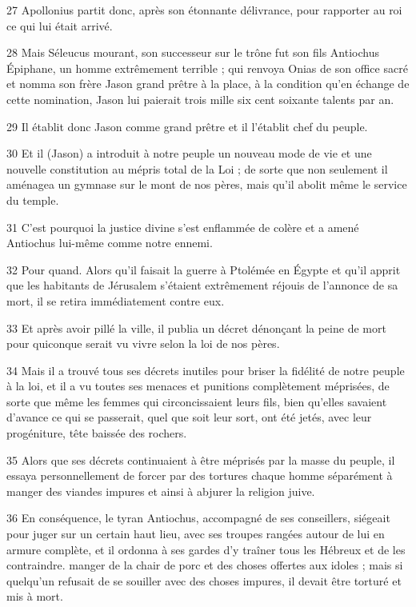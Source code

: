 \par 27 Apollonius partit donc, après son étonnante délivrance, pour rapporter au roi ce qui lui était arrivé.

\par 28 Mais Séleucus mourant, son successeur sur le trône fut son fils Antiochus Épiphane, un homme extrêmement terrible ; qui renvoya Onias de son office sacré et nomma son frère Jason grand prêtre à la place, à la condition qu'en échange de cette nomination, Jason lui paierait trois mille six cent soixante talents par an.

\par 29 Il établit donc Jason comme grand prêtre et il l'établit chef du peuple.

\par 30 Et il (Jason) a introduit à notre peuple un nouveau mode de vie et une nouvelle constitution au mépris total de la Loi ; de sorte que non seulement il aménagea un gymnase sur le mont de nos pères, mais qu'il abolit même le service du temple.

\par 31 C'est pourquoi la justice divine s'est enflammée de colère et a amené Antiochus lui-même comme notre ennemi.

\par 32 Pour quand. Alors qu'il faisait la guerre à Ptolémée en Égypte et qu'il apprit que les habitants de Jérusalem s'étaient extrêmement réjouis de l'annonce de sa mort, il se retira immédiatement contre eux.

\par 33 Et après avoir pillé la ville, il publia un décret dénonçant la peine de mort pour quiconque serait vu vivre selon la loi de nos pères.

\par 34 Mais il a trouvé tous ses décrets inutiles pour briser la fidélité de notre peuple à la loi, et il a vu toutes ses menaces et punitions complètement méprisées, de sorte que même les femmes qui circoncissaient leurs fils, bien qu'elles savaient d'avance ce qui se passerait, quel que soit leur sort, ont été jetés, avec leur progéniture, tête baissée des rochers.

\par 35 Alors que ses décrets continuaient à être méprisés par la masse du peuple, il essaya personnellement de forcer par des tortures chaque homme séparément à manger des viandes impures et ainsi à abjurer la religion juive.

\par 36 En conséquence, le tyran Antiochus, accompagné de ses conseillers, siégeait pour juger sur un certain haut lieu, avec ses troupes rangées autour de lui en armure complète, et il ordonna à ses gardes d'y traîner tous les Hébreux et de les contraindre. manger de la chair de porc et des choses offertes aux idoles ; mais si quelqu'un refusait de se souiller avec des choses impures, il devait être torturé et mis à mort.


